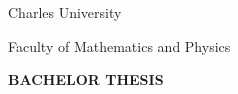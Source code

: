 

\pagestyle{empty}
\hypersetup{pageanchor=false}
\begin{center}
{\large Charles University}

\vspace{4mm}
{\large Faculty of Mathematics and Physics}

\vfill

{\bf\huge BACHELOR THESIS}

\vfill

{\large\YearSubmitted} \hfill {\large\ThesisAuthor}

\end{center}

\newpage
